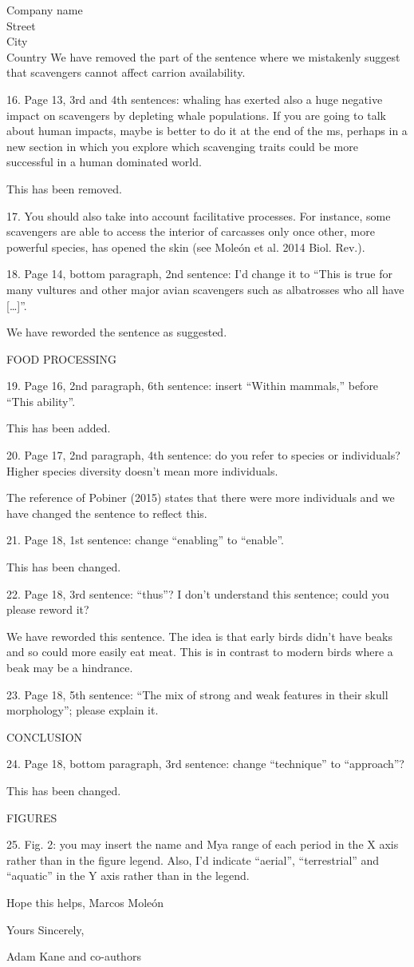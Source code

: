 \documentclass{letter}
\begin{document}
\begin{letter}{Company name \\ Street\\ City\\ Country}
We have removed the part of the sentence where we mistakenly suggest that scavengers cannot affect carrion availability. 

16. Page 13, 3rd and 4th sentences: whaling has exerted also a huge negative impact on scavengers by depleting whale populations. If you are going to talk about human impacts, maybe is better to do it at the end of the ms, perhaps in a new section in which you explore which scavenging traits could be more successful in a human dominated world.

This has been removed. 

17. You should also take into account facilitative processes. For instance, some scavengers are able to access the interior of carcasses only once other, more powerful species, has opened the skin (see Moleón et al. 2014 Biol. Rev.).

18. Page 14, bottom paragraph, 2nd sentence: I’d change it to “This is true for many vultures and other major avian scavengers such as albatrosses who all have […]”.

We have reworded the sentence as suggested. 

FOOD PROCESSING

19. Page 16, 2nd paragraph, 6th sentence: insert “Within mammals,” before “This ability”.

This has been added. 

20. Page 17, 2nd paragraph, 4th sentence: do you refer to species or individuals? Higher species diversity doesn’t mean more individuals.

The reference of Pobiner (2015) states that there were more individuals and we have changed the sentence to reflect this. 

21. Page 18, 1st sentence: change “enabling” to “enable”.

This has been changed. 

22. Page 18, 3rd sentence: “thus”? I don’t understand this sentence; could you please reword it?

We have reworded this sentence. The idea is that early birds didn't have beaks and so could more easily eat meat. This is in contrast to modern birds where a beak may be a hindrance.

23. Page 18, 5th sentence: “The mix of strong and weak features in their skull morphology”; please explain it.

CONCLUSION

24. Page 18, bottom paragraph, 3rd sentence: change “technique” to “approach”?

This has been changed. 

FIGURES

25. Fig. 2: you may insert the name and Mya range of each period in the X axis rather than in the figure legend. Also, I’d indicate “aerial”, “terrestrial” and “aquatic” in the Y axis rather than in the legend.


Hope this helps,
Marcos Moleón

\bigskip
Yours Sincerely,

Adam Kane and co-authors 
\end{letter}
\end{document}
